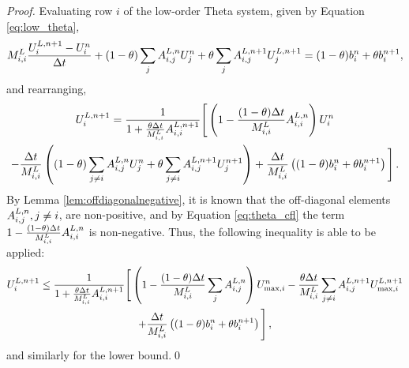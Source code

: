 \begin{proof}
Evaluating row $i$ of the low-order Theta system, given by Equation
\eqref{eq:low_theta},
\[
  M^L_{i,i}\frac{U_i^{L,n+1}-U_i^n}
    {\Delta t}
  + (1-\theta)\sum\limits_jA_{i,j}^{L,n}U_j^n
  + \theta\sum\limits_jA_{i,j}^{L,n+1}U_j^{L,n+1}
  = (1-\theta)b_i^n + \theta b_i^{n+1},
\]
and rearranging,
\begin{multline*}
   U_i^{L,n+1}
   = \frac{1}{1+\frac{\theta\Delta t}{M^L_{i,i}}
       A_{i,i}^{L,n+1}}
     \Bigg[\left(1 - \frac{(1-\theta)\Delta t}{M^L_{i,i}}
     A_{i,i}^{L,n}\right)U_i^n
     \\
     - \frac{\Delta t}{M^L_{i,i}}\left(
       (1-\theta)\sum\limits_{j\ne i}A_{i,j}^{L,n}U_j^n
       + \theta\sum\limits_{j\ne i}A_{i,j}^{L,n+1}U_j^{n+1}\right)
     + \frac{\Delta t}{M^L_{i,i}}
       \left((1-\theta)b_i^n + \theta b_i^{n+1}\right)\Bigg] \,.
\end{multline*}
By Lemma \ref{lem:offdiagonalnegative}, it is known that the off-diagonal
elements $A^{L,n}_{i,j}, j\ne i$, are non-positive, and by Equation
\eqref{eq:theta_cfl} the term $1 -
\frac{(1-\theta)\Delta t}{M^L_{i,i}}A_{i,i}^{L,n}$
is non-negative. Thus, the following inequality is able to be applied:
\begin{multline*}
   U_i^{L,n+1}
   \le \frac{1}{1+\frac{\theta\Delta t}{M^L_{i,i}}
     A_{i,i}^{L,n+1}}
     \Bigg[\left(1 - \frac{(1-\theta)\Delta t}{M^L_{i,i}}
       \sum\limits_jA_{i,j}^{L,n}\right)U_{\max,i}^n
       - \frac{\theta\Delta t}{M^L_{i,i}}
         \sum\limits_{j\ne i}A_{i,j}^{L,n+1}U_{\max,i}^{L,n+1}
     \\
       + \frac{\Delta t}{M^L_{i,i}}
         \left((1-\theta)b_i^n + \theta b_i^{n+1}\right)\Bigg] \,,
\end{multline*}
and similarly for the lower bound.\qed
\end{proof}
